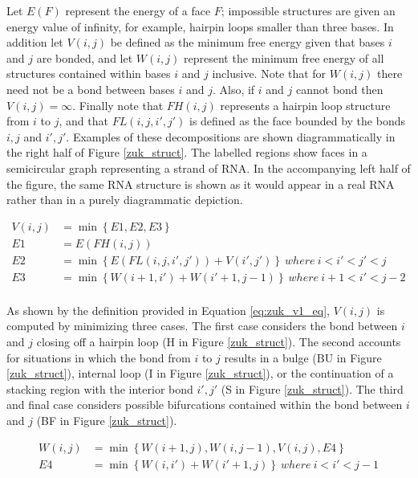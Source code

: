 \documentclass{cshonours}
\begin{document}
Let $E(F)$ represent the energy of a face $F$; impossible structures are given
an energy value of infinity, for example, hairpin loops smaller than three bases. In addition let $V(i, j)$ be defined as the minimum free
energy given that bases $i$ and $j$ are bonded, and let $W(i, j)$ represent
the minimum free energy of all structures contained within bases $i$ and $j$ inclusive.
Note that for $W(i, j)$ there need not be a bond between bases $i$ and $j$. Also,
if $i$ and $j$ cannot bond then $V(i, j) = \infty $. Finally note that $FH(i, j)$ represents a
hairpin loop structure from $i$ to $j$, and that $FL(i, j, i' , j' )$ is defined as the face bounded by the bonds $i, j$ and $i', j'$. Examples of these decompositions are shown
diagrammatically in the right half of Figure \ref{zuk_struct}. The labelled regions show faces
in a semicircular graph representing a strand of RNA. In the accompanying left
half of the figure, the same RNA structure is shown as it would appear in a real
RNA rather than in a purely diagrammatic depiction.


\begin{align} \label{eq:zuk_v1_eq}
	V(i, j) &= \min \left\lbrace E1, E2, E3 \right\rbrace \nonumber \\
	E1 &= E(FH(i, j)) \nonumber \\
	E2 &= \min \left\lbrace E(FL(i, j, i', j')) + V (i', j') \right\rbrace \: where \: i < i' < j' < j \nonumber \\
	E3 &= \min \left\lbrace W (i + 1, i') + W (i' + 1, j - 1) \right\rbrace \: where \: i + 1 < i' < j - 2 \nonumber \\
\end{align}


As shown by the definition provided in Equation \ref{eq:zuk_v1_eq}, $V (i, j)$ is computed by minimizing
three cases. The first case considers the bond between $i$ and $j$ closing off a hairpin
loop (H in Figure \ref{zuk_struct}). The second accounts for situations in which the bond from $i$ to $j$ results in a bulge (BU in Figure \ref{zuk_struct}), internal loop (I in Figure \ref{zuk_struct}), or the continuation of a stacking region with the
interior bond $i',j'$ (S in Figure \ref{zuk_struct}). The third and final case considers possible bifurcations contained within the bond between $i$ and $j$ (BF in Figure \ref{zuk_struct}).

\begin{align} \label{eq:zuk_v1_eq2}
	W (i, j) &= \min \left\lbrace W(i + 1, j), W(i, j - 1), V(i, j), E4 \right\rbrace \nonumber \\
	E4 &= \min \left\lbrace W (i, i') + W (i' + 1, j) \right\rbrace \: where \: i < i' < j - 1 \nonumber \\
\end{align}
\end{document}
